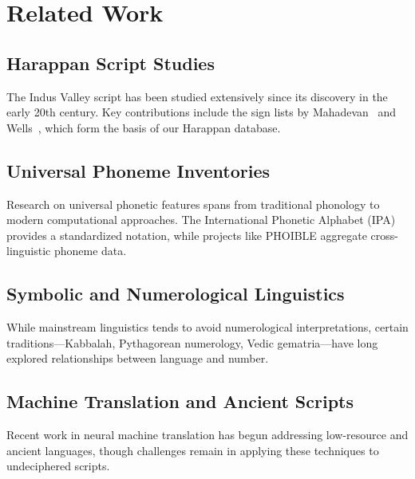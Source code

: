 \section{Related Work}
\label{sec:related-work}


\subsection{Harappan Script Studies}
The Indus Valley script has been studied extensively since its discovery
in the early 20th century. Key contributions include the sign lists by
Mahadevan~\citep{mahadevan1977} and Wells~\citep{wells2015}, which form
the basis of our Harappan database.

\subsection{Universal Phoneme Inventories}
Research on universal phonetic features spans from traditional phonology
to modern computational approaches. The International Phonetic Alphabet
(IPA) provides a standardized notation, while projects like PHOIBLE
aggregate cross-linguistic phoneme data.

\subsection{Symbolic and Numerological Linguistics}
While mainstream linguistics tends to avoid numerological interpretations,
certain traditions—Kabbalah, Pythagorean numerology, Vedic gematria—have
long explored relationships between language and number.

\subsection{Machine Translation and Ancient Scripts}
Recent work in neural machine translation has begun addressing low-resource
and ancient languages, though challenges remain in applying these techniques
to undeciphered scripts.
